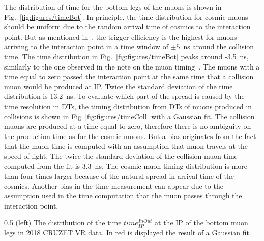 The distribution of time for the bottom legs of the muons is shown in Fig.~\ref{fig:figures/timeBot}. In principle, the time distribution for cosmic muons should be uniform due to the random arrival time of cosmics to the interaction point. But as mentioned in~\cite{Chatrchyan:2009ig}, the trigger efficiency is the highest for muons arriving to the interaction point in a time window of $\pm 5$~ns around the collision time. The time distribution in Fig.~\ref{fig:figures/timeBot} peaks around -3.5~ns, similarly to the one observed in the note on the muon timing~\cite{Traczyk:1365029}. The muons with a time equal to zero passed the interaction point at the same time that a collision muon would be produced at IP. Twice the standard deviation of the time distribution is 13.2~ns. To evaluate which part of the spread is caused by the time resolution in DTs, the timing distribution from DTs of muons produced in collisions is shown in Fig~\ref{fig:figures/timeColl} with a Gaussian fit. The collision muons are produced at a time equal to zero, therefore there is no ambiguity on the production time as for the cosmic muons. But a bias originates from the fact that the muon time is computed with an assumption that muon travels at the speed of light. The twice the standard deviation of the collision muon time computed from the fit is 3.3~ns. The cosmic muon timing distribution is more than four times larger because of the natural spread in arrival time of the cosmics. Another bias in the time measurement can appear due to the assumption used in the time computation that the muon passes through the interaction point.
 

                 {0.5}       %
                 {(left) The distribution of the time $time_{IP}^{InOut}$ at the IP of the bottom muon legs in 2018 CRUZET VR data. In red is displayed the result of a Gaussian fit.  }


